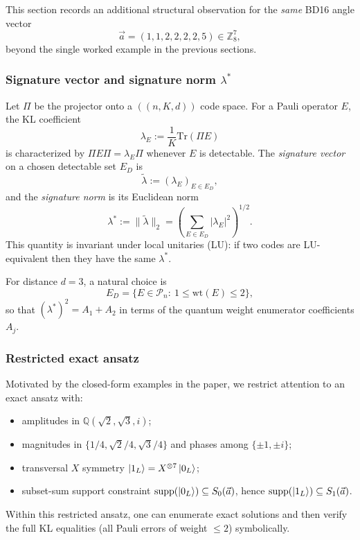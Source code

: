 \documentclass[11pt]{article}
\begin{document}
This section records an additional structural observation for the \emph{same} BD16 angle vector
\[
\vec a=(1,1,2,2,2,2,5)\in \mathbb{Z}_8^7,
\]
beyond the single worked example in the previous sections.

\subsubsection{Signature vector and signature norm \texorpdfstring{$\lambda^\ast$}{lambda*}}

Let \(\Pi\) be the projector onto a \(((n,K,d))\) code space. For a Pauli operator \(E\), the KL coefficient
\[
\lambda_E := \frac{1}{K}\mathrm{Tr}(\Pi E)
\]
is characterized by \(\Pi E \Pi = \lambda_E \Pi\) whenever \(E\) is detectable. The \emph{signature vector} on a chosen detectable set \(E_D\) is
\[
\tilde{\lambda} := (\lambda_E)_{E\in E_D},
\]
and the \emph{signature norm} is its Euclidean norm
\[
\lambda^\ast := \|\tilde{\lambda}\|_2 = \left(\sum_{E\in E_D}|\lambda_E|^2\right)^{1/2}.
\]
This quantity is invariant under local unitaries (LU): if two codes are LU-equivalent then they have the same \(\lambda^\ast\).

For distance \(d=3\), a natural choice is
\[
E_D=\{E\in\mathcal{P}_n:\ 1\le \mathrm{wt}(E)\le 2\},
\]
so that \((\lambda^\ast)^2=A_1+A_2\) in terms of the quantum weight enumerator coefficients \(A_j\).

\subsubsection{Restricted exact ansatz}

Motivated by the closed-form examples in the paper, we restrict attention to an exact ansatz with:
\begin{itemize}
\item amplitudes in \(\mathbb{Q}(\sqrt2,\sqrt3,i)\);
\item magnitudes in \(\{1/4,\sqrt2/4,\sqrt3/4\}\) and phases among \(\{\pm 1,\pm i\}\);
\item transversal \(X\) symmetry \(\ket{1_L}=X^{\otimes 7}\ket{0_L}\);
\item subset-sum support constraint \(\mathrm{supp}(\ket{0_L})\subseteq S_0(\vec a)\), hence \(\mathrm{supp}(\ket{1_L})\subseteq S_1(\vec a)\).
\end{itemize}

Within this restricted ansatz, one can enumerate exact solutions and then verify the full KL equalities (all Pauli errors of weight \(\le 2\)) symbolically.
\end{document}
